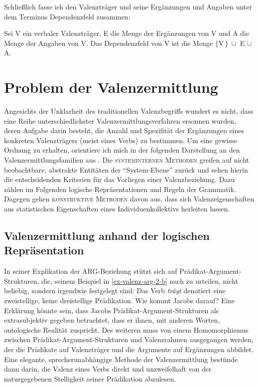 Schlie\ss lich fasse ich den Valenzträger und seine Ergänzungen und Angaben unter dem Terminus Dependenzfeld zusammen:
\begin{definition}[Dependenzfeld] \label{def-dependenzfeld}
Sei V ein verbaler Valenzträger, E die Menge der Ergänzungen von V und A die Menge der Angaben von V. Das Dependenzfeld von V ist die Menge $\{$V\,$\} \ \cup$ E $\cup$ A.
\end{definition}




\section{Problem der Valenzermittlung} \label{sec-valenzermittlung}

Angesichts der Unklarheit des traditionellen Valenzbegriffs wundert es nicht, dass eine Reihe unterschiedlichster Valenzermittlungsverfahren ersonnen wurden, deren Aufgabe darin besteht, die Anzahl und Spezifität der Ergänzungen eines konkreten Valenzträgers (meist eines Verbs) zu bestimmen. Um eine gewisse Ordnung zu erhalten, orientiere ich mich in der folgenden Darstellung an den Valenzermittlungsfamilien aus \citet[7.2.2]{Storrer:92}. Die \textsc{systeminternen Methoden} greifen auf nicht beobachtbare, abstrakte Entitäten der "`System-Ebene"' zurück und sehen hierin die entscheidenden Kriterien für das Vorliegen einer Valenzbeziehung. Dazu zählen im Folgenden logische Repräsentationen und Regeln der Grammatik. Dagegen gehen \textsc{konstruktive Methoden} davon aus, dass sich Valenzeigenschaften aus statistischen Eigenschaften eines Individuenkollektivs herleiten lassen.



\subsection{Valenzermittlung anhand der logischen Repräsentation} 

In seiner Explikation der ARG-Beziehung stützt sich \cite{Jacobs:94} auf Prädikat-Argument-Strukturen, die, seinem Beispiel in \ref{ex-valenz-arg-2-b} nach zu urteilen, nicht beliebig, sondern irgendwie festgelegt sind: Das Verb {\it trägt} denotiert eine zweistellige, keine dreistellige Prädikation. Wie kommt Jacobs darauf? Eine Erklärung könnte sein, dass Jacobs Prädikat-Argument-Strukturen als extrasubjektiv gegeben betrachtet, dass er ihnen, mit anderen Worten, ontologische Realität zuspricht. Des weiteren muss von einem Homomorphismus zwischen Prädikat-Argument-Strukturen und Valenzrahmen ausgegangen werden, der die Prädikate auf Valenzträger und die Argumente auf Ergänzungen abbildet. Eine elegante, sprecherunabhängige Methode der Valenzermittlung bestünde dann darin, die Valenz eines Verbs direkt und unzweifelhaft von der naturgegebenen Stelligkeit seiner Prädikation abzulesen.

